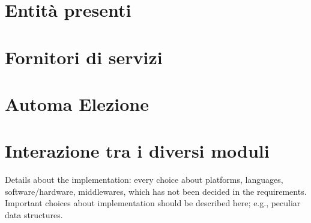 \section{Entità presenti}

\section{Fornitori di servizi}

\section{Automa Elezione}

\section{Interazione tra i diversi moduli}


Details about the implementation: every choice about platforms, languages, software/hardware, middlewares, which has not been decided in the requirements.
Important choices about implementation should be described here; e.g., peculiar data structures.
